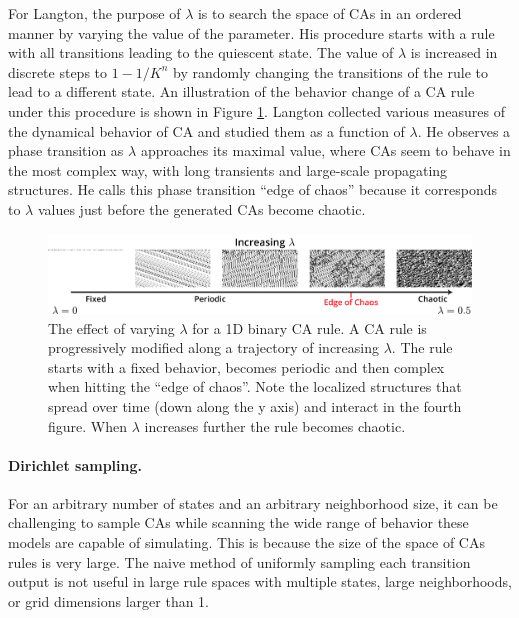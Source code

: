 For Langton, the purpose of $\lambda$ is to search the space of \acp{CA} in an ordered
manner by varying the value of the parameter. His procedure starts with a rule
with all transitions leading to the quiescent state. The value of $\lambda$ is
increased in discrete steps to $1 - 1 / K^{n}$ by randomly changing the
transitions of the rule to lead to a different state. An illustration of the
behavior change of a \ac{CA} rule under this procedure is shown in Figure
\ref{fig:langton_lambda}. Langton collected various measures of the dynamical
behavior of \ac{CA} and studied them as a function of $\lambda$. He observes a phase
transition as $\lambda$ approaches its maximal value, where \acp{CA} seem to behave
in the most complex way, with long transients and large-scale propagating
structures. He calls this phase transition ``edge of chaos'' because it
corresponds to $\lambda$ values just before the generated \acp{CA} become
chaotic.

\begin{figure}[htbp]
  \centering
  \includegraphics[width=\linewidth]{figures/langton_lambda.pdf}
  \caption{The effect of varying $\lambda$ for a 1D binary \ac{CA} rule. A \ac{CA}
    rule is progressively modified along a trajectory of increasing $\lambda$. The
    rule starts with a fixed behavior, becomes periodic and then complex when
    hitting the ``edge of chaos''. Note the localized structures that spread
    over time (down along the y axis) and interact in the fourth figure. When
    $\lambda$ increases further the rule becomes chaotic.}
  \label{fig:langton_lambda}
\end{figure}

\paragraph{Dirichlet sampling.}
For an arbitrary number of states and an arbitrary neighborhood size, it can be
challenging to sample \acp{CA} while scanning the wide range of behavior these
models are capable of simulating. This is because the size of the space of
\acp{CA} rules is very large. The naive method of uniformly sampling each
transition output is not useful in large rule spaces with multiple states, large
neighborhoods, or grid dimensions larger than 1.

